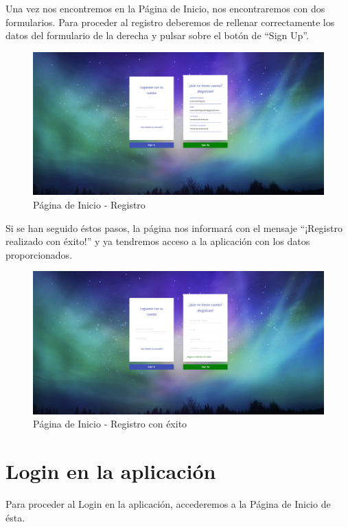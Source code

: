 \documentclass[11pt,openany]{book}
\begin{document}
\pagebreak
Una vez nos encontremos en la Página de Inicio, nos encontraremos con dos formularios. Para proceder al registro deberemos de rellenar correctamente los datos del formulario de la derecha y pulsar sobre el botón de ``Sign Up''. 

\begin{figure}[H]
\centering
\includegraphics[totalheight=6cm]{manualUsuario/registro.png}
\caption{Página de Inicio - Registro}
\end{figure}

Si se han seguido éstos pasos, la página nos informará con el mensaje ``¡Registro realizado con éxito!'' y ya tendremos acceso a la aplicación con los datos proporcionados.

\begin{figure}[H]
\centering
\includegraphics[totalheight=6cm]{manualUsuario/registroConExito.png}
\caption{Página de Inicio - Registro con éxito}
\end{figure}

\section{Login en la aplicación}

Para proceder al Login en la aplicación, accederemos a la Página de Inicio de ésta.
\end{document}
